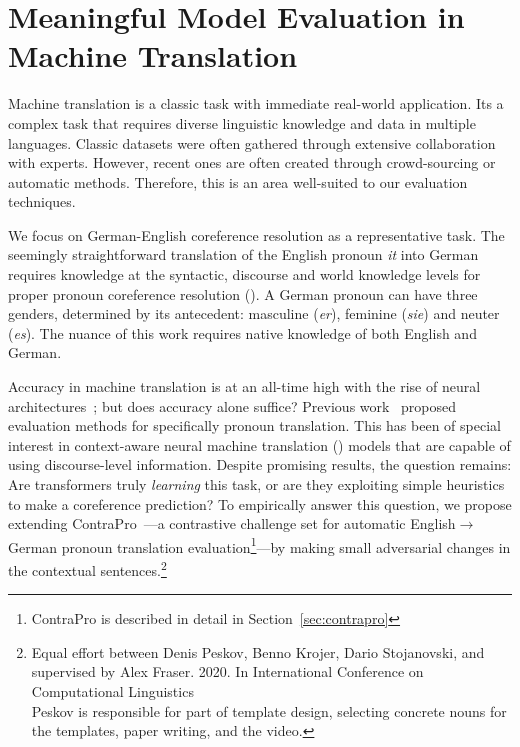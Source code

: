 \section{Meaningful Model Evaluation in Machine Translation}
\label{sec:propeval}

%

%


Machine translation is a classic \nlp{} task with immediate real-world application.
%
Its a complex task that requires diverse linguistic knowledge and data in multiple languages.
%
Classic datasets were often gathered through extensive collaboration with experts.
%
However, recent ones are often created through crowd-sourcing or automatic methods. 
%
Therefore, this is an area well-suited to our evaluation techniques.  

We focus on German-English coreference resolution as a representative task.  
%
The seemingly straightforward translation of the English pronoun \textit{it} into German requires knowledge at the syntactic, discourse and world knowledge levels for proper pronoun coreference resolution (\coref{}).
%
A German pronoun can have three genders, determined by its antecedent: masculine (\emph{er}), feminine (\emph{sie}) and neuter (\emph{es}).
%
The nuance of this work requires native knowledge of both English and German.  

Accuracy in machine translation is at an all-time high with the rise of neural architectures~\citep{wu2016googles}; but does accuracy alone suffice?  
%
Previous work~\citep{hardmeier2010modelling,miculicich-werlen-popescu-belis-2017-validation,mueller2018} proposed evaluation methods for specifically pronoun translation. 
%
This has been of special interest in context-aware neural machine translation (\nmt{}) models that are capable of using discourse-level information.
%
Despite promising results, the question remains: 
Are transformers \citep{vaswani2017attention} truly \textit{learning} this task, or are they exploiting simple heuristics to make a coreference prediction?
% 
To empirically answer this question, we propose extending ContraPro~\citep{mueller2018}---a contrastive challenge set for automatic English$\rightarrow$German pronoun translation evaluation\footnote{ContraPro is described in detail in Section~\ref{sec:contrapro}}---by making small adversarial changes in the contextual sentences.\footnote{Equal effort between Denis Peskov, Benno Krojer, Dario Stojanovski, and supervised by Alex Fraser. 2020. In International Conference on Computational Linguistics \\ Peskov is responsible for part of template design, selecting concrete nouns for the templates, paper writing, and the video.}

